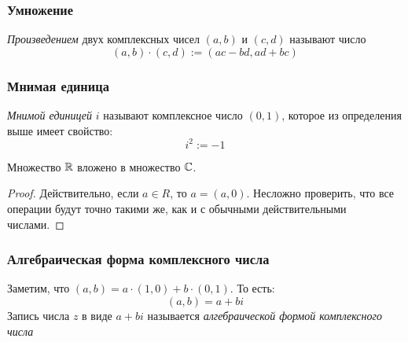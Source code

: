\subsubsection*{Умножение}

\begin{definition}
    \textit{Произведением} двух комплексных чисел $(a, b)$ и $(c, d)$ называют число
    $$
        (a, b) \cdot (c, d) := (ac - bd, ad + bc)
    $$
\end{definition}

\subsubsection*{Мнимая единица}

\begin{definition}
    \textit{Мнимой единицей} $i$ называют комплексное число $(0, 1)$, которое из определения выше имеет свойство:
    $$
        i^2 := -1
    $$
\end{definition}

\begin{proposition}
    Множество $\mathbb{R}$ вложено в множество $\mathbb{C}$.
\end{proposition}

\begin{proof}
    Действительно, если $a \in R$, то $a = (a, 0)$. Несложно проверить, что все операции будут точно такими же, как и с обычными действительными числами.
\end{proof}

\subsubsection*{Алгебраическая форма комплексного числа}

\begin{definition}
    Заметим, что $(a, b) = a \cdot (1, 0) + b \cdot (0, 1)$. То есть:
    $$
        (a, b) = a + bi
    $$
    Запись числа $z$ в виде $a + bi$ называется \textit{алгебраической формой комплексного числа}
\end{definition}

\begin{center}
\end{center}

